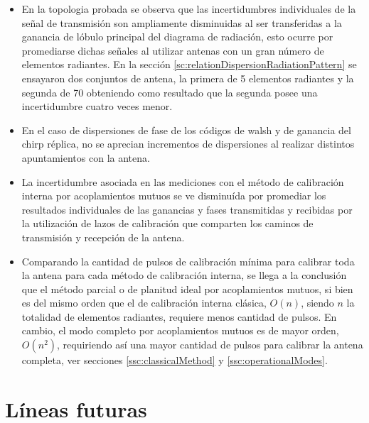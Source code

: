 \begin{itemize}
	\item En la topologia probada se observa que las incertidumbres individuales de la señal de transmisión son ampliamente
		disminuidas al ser transferidas a la ganancia de lóbulo principal del diagrama de radiación, esto ocurre por
		promediarse dichas señales al utilizar antenas con un gran número de elementos radiantes. En la sección
		\ref{sc:relationDispersionRadiationPattern} se ensayaron dos conjuntos de antena, la primera de 5 elementos radiantes y
		la segunda de 70 obteniendo como resultado que la segunda posee una incertidumbre cuatro veces menor.
	\item En el caso de dispersiones de fase de los códigos de walsh y de ganancia del chirp réplica, no se aprecian incrementos
		de dispersiones al realizar distintos apuntamientos con la antena.
	\item La incertidumbre asociada en las mediciones con el método de calibración interna por acoplamientos mutuos se ve
		disminuída por promediar los resultados individuales de las ganancias y fases transmitidas y recibidas por la utilización
		de lazos de calibración que comparten los caminos de transmisión y recepción de la antena.
	\item Comparando la cantidad de pulsos de calibración mínima para calibrar toda la antena para cada método de calibración
		interna, se llega a la conclusión que el método parcial o de planitud ideal por acoplamientos mutuos, si bien es del
		mismo orden que el de calibración interna clásica, $O(n)$, siendo $n$ la totalidad de elementos radiantes, requiere menos
		cantidad de pulsos. En cambio, el modo completo por acoplamientos mutuos es de mayor orden, $O(n^2)$, requiriendo así una
		mayor cantidad de pulsos para calibrar la antena completa, ver secciones \ref{ssc:classicalMethod} y
		\ref{ssc:operationalModes}. 
\end{itemize}


\section{Líneas futuras}

